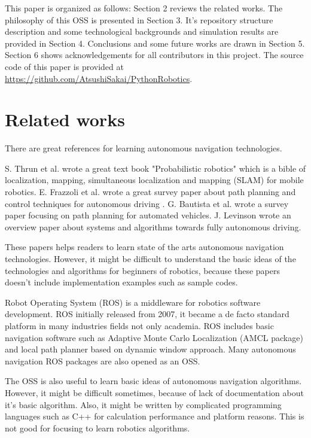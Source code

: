 \documentclass{bmvc2k}
\begin{document}
This paper is organized as follows: Section 2 reviews the related works. The philosophy of this OSS is presented in Section 3. It's repository structure description and some technological backgrounds and simulation results are provided in Section 4. Conclusions and some future works are drawn in Section 5. Section 6 shows acknowledgements for all contributors  in this project. The source code of this paper is provided at \url{https://github.com/AtsushiSakai/PythonRobotics}.


\section{Related works}

There are great references for learning autonomous navigation technologies.

S. Thrun et al. wrote a great text book "Probabilistic robotics" which is a bible of localization, mapping, simultaneous localization and mapping (SLAM) for mobile robotics\cite{PR}.
E. Frazzoli et al. wrote a great survey paper about path planning and control techniques for autonomous driving \cite{pathtracking}.
G. Bautista et al. wrote a survey paper focusing on path planning for automated vehicles\cite{pathplanning}.
J. Levinson wrote an overview paper about systems and algorithms towards fully autonomous driving\cite{Levinson2011}.

These papers helps readers to learn state of the arts autonomous navigation technologies.
However, it might be difficult to understand the basic ideas of the technologies and algorithms for beginners of robotics, because these papers doesn't include implementation examples such as sample codes.

Robot Operating System (ROS) is a middleware for robotics software development\cite{ros}\cite{rospaper}.
ROS initially released from 2007, it became a de facto standard platform in many industries fields not only academia.
ROS includes basic navigation software such as Adaptive Monte Carlo Localization (AMCL package) and local path planner based on dynamic window approach\cite{rosnavigation}.
Many autonomous navigation ROS packages are also opened as an OSS.

The OSS is also useful to learn basic ideas of autonomous navigation algorithms.
However, it might be difficult sometimes, because of lack of documentation about it's basic algorithm.
Also, it might be written by complicated programming languages such as C++ for calculation performance and platform reasons.
This is not good for focusing to learn robotics algorithms.
\end{document}
